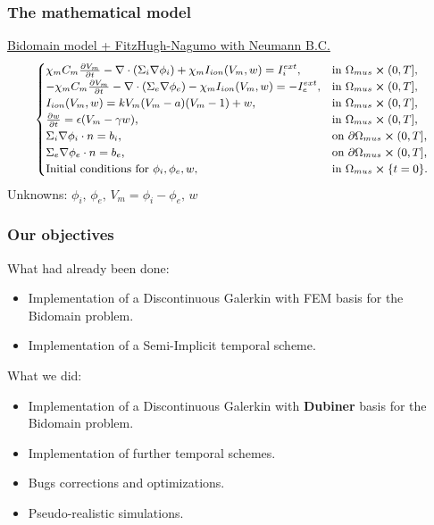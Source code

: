 \documentclass[8pt]{beamer}
\begin{document}
\begin{frame}
\frametitle{The mathematical model}
\center
\underline{Bidomain model + FitzHugh-Nagumo with Neumann B.C.}
\begin{equation*}
\small
\begin{cases}
\chi_m C_m\pdv{V_m}{t} - \nabla \cdot (\Sigma_i \nabla \phi_i) + \chi_m I_{ion}(V_m,w) = I_i^{ext},    & \text{in } \Omega_{mus} \cross (0,T],
\\
-\chi_m C_m\pdv{V_m}{t} - \nabla \cdot (\Sigma_e \nabla \phi_e) - \chi_m I_{ion}(V_m,w) = -I_e^{ext},    & \text{in } \Omega_{mus} \cross (0,T],
\\
I_{ion}(V_m,w)=kV_m(V_m-a)(V_m-1)+w, & \text{in } \Omega_{mus} \cross (0,T],
\\
\pdv{w}{t} = \epsilon(V_m-\gamma w),  & \text{in } \Omega_{mus} \cross (0,T],
\\
\Sigma_i\nabla \phi_i \cdot n = b_i,   & \text{on } \partial \Omega_{mus} \cross (0,T],
\\
\Sigma_e\nabla \phi_e \cdot n = b_e,   & \text{on } \partial \Omega_{mus} \cross (0,T],
\\
\text{Initial conditions for } \phi_i,\phi_e, w, & \text{in } \Omega_{mus}\cross\{t=0\}.
\end{cases}
\end{equation*}
\center \small
Unknowns: $\phi_i,\,\phi_e,\, V_m=\phi_i-\phi_e,\, w$
\end{frame}


\begin{frame}
\frametitle{Our objectives}

What had already been done:
\begin{itemize}
	\item Implementation of a Discontinuous Galerkin with FEM basis for the Bidomain problem.
	\item Implementation of a Semi-Implicit temporal scheme.
\end{itemize} \vspace{2mm}
What we did:
\begin{itemize}
	\item Implementation of a Discontinuous Galerkin with \textbf{Dubiner} basis for the Bidomain problem.
	\item Implementation of further temporal schemes.
	\item Bugs corrections and optimizations.
	\item Pseudo-realistic simulations.
\end{itemize}
\end{frame}
\end{document}
